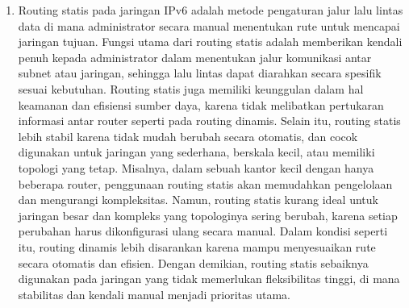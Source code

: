 \begin{enumerate}
    \item Routing statis pada jaringan IPv6 adalah metode pengaturan jalur lalu lintas data di mana administrator secara manual menentukan rute untuk mencapai jaringan tujuan. Fungsi utama dari routing statis adalah memberikan kendali penuh kepada administrator dalam menentukan jalur komunikasi antar subnet atau jaringan, sehingga lalu lintas dapat diarahkan secara spesifik sesuai kebutuhan. Routing statis juga memiliki keunggulan dalam hal keamanan dan efisiensi sumber daya, karena tidak melibatkan pertukaran informasi antar router seperti pada routing dinamis. Selain itu, routing statis lebih stabil karena tidak mudah berubah secara otomatis, dan cocok digunakan untuk jaringan yang sederhana, berskala kecil, atau memiliki topologi yang tetap. Misalnya, dalam sebuah kantor kecil dengan hanya beberapa router, penggunaan routing statis akan memudahkan pengelolaan dan mengurangi kompleksitas. Namun, routing statis kurang ideal untuk jaringan besar dan kompleks yang topologinya sering berubah, karena setiap perubahan harus dikonfigurasi ulang secara manual. Dalam kondisi seperti itu, routing dinamis lebih disarankan karena mampu menyesuaikan rute secara otomatis dan efisien. Dengan demikian, routing statis sebaiknya digunakan pada jaringan yang tidak memerlukan fleksibilitas tinggi, di mana stabilitas dan kendali manual menjadi prioritas utama.
        
\end{enumerate}